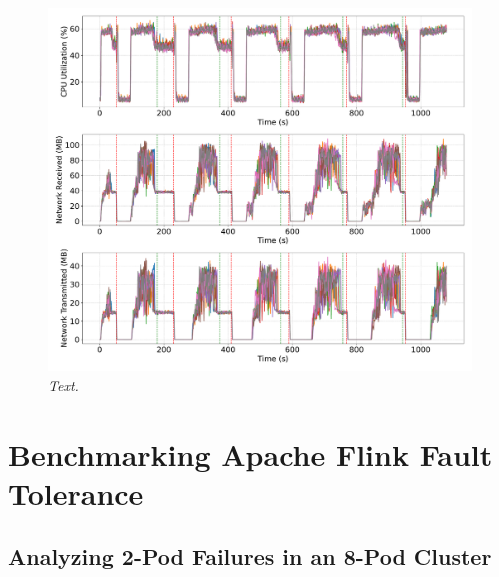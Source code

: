 \begin{figure}[ht]
    \centering
    \includegraphics[width=1\textwidth]{figures/kstreams-8pods/kafka_8_pods_resources}
    \caption{\textit{Text.}}
    \label{fig:kafka-8pods-resource}
\end{figure}




\section{Benchmarking Apache Flink Fault Tolerance}\label{sec:benchmarking-apache-flink-fault-tolerance}

\subsection{Analyzing 2-Pod Failures in an 8-Pod Cluster}\label{subsec:analyzing-2-pod-failures-in-an-8-pod-cluster2}


